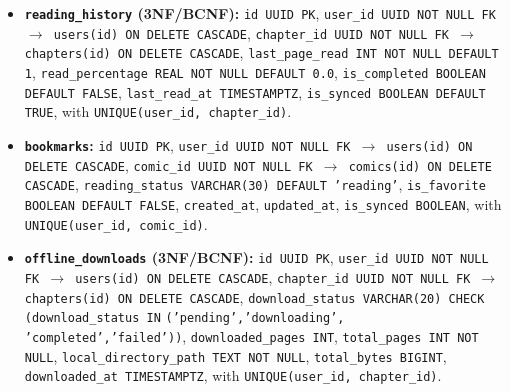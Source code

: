 \begin{itemize}
    \item \textbf{\texttt{reading\_history} (3NF/BCNF):} \texttt{id UUID PK}, \texttt{user\_id UUID NOT NULL FK $\to$ users(id) ON DELETE CASCADE}, \texttt{chapter\_id UUID NOT NULL FK $\to$ chapters(id) ON DELETE CASCADE}, \texttt{last\_page\_read INT NOT NULL DEFAULT 1}, \texttt{read\_percentage REAL NOT NULL DEFAULT 0.0}, \texttt{is\_completed BOOLEAN DEFAULT FALSE}, \texttt{last\_read\_at TIMESTAMPTZ}, \texttt{is\_synced BOOLEAN DEFAULT TRUE}, with \texttt{UNIQUE(user\_id, chapter\_id)}.
    \item \textbf{\texttt{bookmarks}:} \texttt{id UUID PK}, \texttt{user\_id UUID NOT NULL FK $\to$ users(id) ON DELETE CASCADE}, \texttt{comic\_id UUID NOT NULL FK $\to$ comics(id) ON DELETE CASCADE}, \texttt{reading\_status VARCHAR(30) DEFAULT 'reading'}, \texttt{is\_favorite BOOLEAN DEFAULT FALSE}, \texttt{created\_at}, \texttt{updated\_at}, \texttt{is\_synced BOOLEAN}, with \texttt{UNIQUE(user\_id, comic\_id)}.
    \item \textbf{\texttt{offline\_downloads} (3NF/BCNF):} \texttt{id UUID PK}, \texttt{user\_id UUID NOT NULL FK $\to$ users(id) ON DELETE CASCADE}, \texttt{chapter\_id UUID NOT NULL FK $\to$ chapters(id) ON DELETE CASCADE}, \texttt{download\_status VARCHAR(20) CHECK (download\_status IN} \allowbreak \texttt{('pending','downloading',} \allowbreak \texttt{'completed','failed'))}, \texttt{downloaded\_pages INT}, \texttt{total\_pages INT NOT NULL}, \texttt{local\_directory\_path TEXT NOT NULL}, \texttt{total\_bytes BIGINT}, \texttt{downloaded\_at TIMESTAMPTZ}, with \texttt{UNIQUE(user\_id, chapter\_id)}.
\end{itemize}

